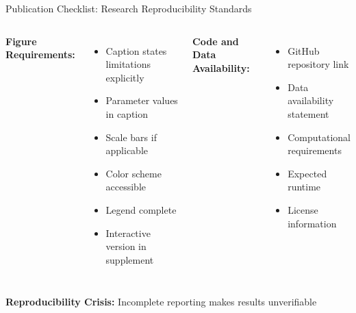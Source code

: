 \documentclass[aspectratio=169]{beamer}
\begin{document}
\begin{frame}{Publication Checklist: Research Reproducibility Standards}
\begin{columns}
\textbf{Figure Requirements:}

\begin{itemize}
\item Caption states limitations explicitly
\item Parameter values in caption
\item Scale bars if applicable
\item Color scheme accessible
\item Legend complete
\item Interactive version in supplement
\end{itemize}

\textbf{Code and Data Availability:}

\begin{itemize}
\item GitHub repository link
\item Data availability statement
\item Computational requirements
\item Expected runtime
\item License information
\end{itemize}
\end{columns}

\vspace{0.3cm}
\colorbox{yellow!20}{\parbox{0.95\textwidth}{\centering\textbf{Reproducibility Crisis:} Incomplete reporting makes results unverifiable}}
\end{frame}
\end{document}
